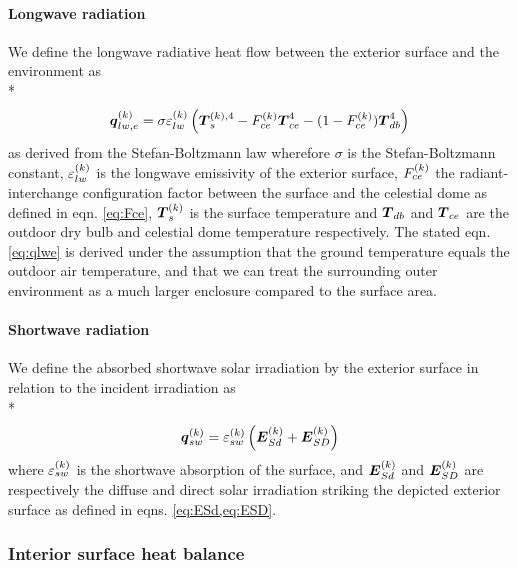 \paragraph{Longwave radiation}
We define the longwave radiative heat flow between the exterior surface and the environment as \\*
\begin{equation}
\boldsymbol{q}_{lw,e}^{(k)}=\sigma \varepsilon_{lw}^{(k)} \left(\boldsymbol{T}_{s}^{(k),4} - F_{ce}^{(k)} \boldsymbol{T}_{ce}^{4} - (1-F_{ce}^{(k)}) \boldsymbol{T}_{db}^{4}\right)
\label{eq:qlwe}
\end{equation}
as derived from the Stefan-Boltzmann law wherefore $\sigma$ is the Stefan-Boltzmann constant, $\varepsilon_{lw}^{(k)}$ is the longwave emissivity of the exterior surface, $F_{ce}^{(k)}$ the radiant-interchange configuration factor between the surface and the celestial dome as defined in eqn. \ref{eq:Fce}, $\boldsymbol{T}_{s}^{(k)}$ is the surface temperature and $\boldsymbol{T}_{db}$ and $\boldsymbol{T}_{ce}$ are the outdoor dry bulb and celestial dome temperature respectively.\citep{Stefan1879,Boltzmann1884,Mohr2008,Hamilton1952} The stated eqn. \ref{eq:qlwe} is derived under the assumption that the ground temperature equals the outdoor air temperature, and that we can treat the surrounding outer environment as a much larger enclosure compared to the surface area.

\paragraph{Shortwave radiation}
We define the absorbed shortwave solar irradiation by the exterior surface in relation to the incident irradiation as \\*
\begin{equation}
\boldsymbol{q}_{sw}^{(k)}=\varepsilon_{sw}^{(k)} \left( \boldsymbol{E}_{Sd}^{(k)} + \boldsymbol{E}_{SD}^{(k)} \right)
\end{equation}
where $\varepsilon_{sw}^{(k)}$ is the shortwave absorption of the surface, and $\boldsymbol{E}_{Sd}^{(k)}$ and $\boldsymbol{E}_{SD}^{(k)}$ are respectively the diffuse and direct solar irradiation striking the depicted exterior surface as defined in eqns. \ref{eq:ESd,eq:ESD}. 

\subsubsection{Interior surface heat balance}
\label{sec:int}

